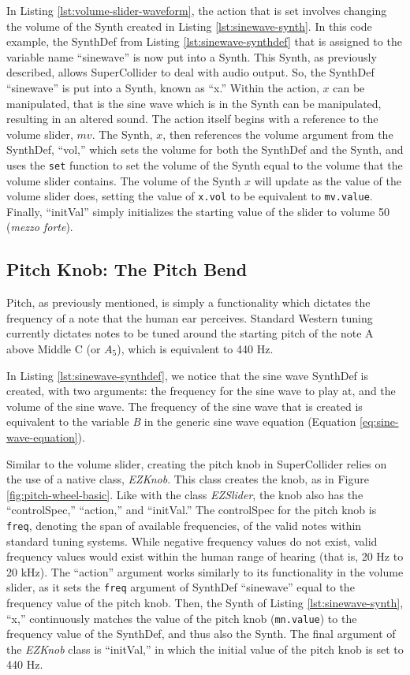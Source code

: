 In Listing \ref{lst:volume-slider-waveform}, the action that is set involves changing the volume of the Synth created in Listing \ref{lst:sinewave-synth}. In this code example, the SynthDef from Listing \ref{lst:sinewave-synthdef} that is assigned to the variable name ``sinewave'' is now put into a Synth. This Synth, as previously described, allows SuperCollider to deal with audio output. So, the SynthDef ``sinewave'' is put into a Synth, known as ``x.'' Within the action, $x$ can be manipulated, that is the sine wave which is in the Synth can be manipulated, resulting in an altered sound. The action itself begins with a reference to the volume slider, $mv$. The Synth, $x$, then references the volume argument from the SynthDef, ``vol,'' which sets the volume for both the SynthDef and the Synth, and uses the \texttt{set} function to set the volume of the Synth equal to the volume that the volume slider contains. The volume of the Synth $x$ will update as the value of the volume slider does, setting the value of \texttt{x.vol} to be equivalent to \texttt{mv.value}. Finally, ``initVal'' simply initializes the starting value of the slider to volume 50 (\textit{mezzo forte}).

\subsection{Pitch Knob: The Pitch Bend}

Pitch, as previously mentioned, is simply a functionality which dictates the frequency of a note that the human ear perceives. Standard Western tuning currently dictates notes to be tuned around the starting pitch of the note A above Middle C (or $A_5$), which is equivalent to 440 Hz.

In Listing \ref{lst:sinewave-synthdef}, we notice that the sine wave SynthDef is created, with two arguments: the frequency for the sine wave to play at, and the volume of the sine wave. The frequency of the sine wave that is created is equivalent to the variable \textit{B} in the generic sine wave equation (Equation \ref{eq:sine-wave-equation}).

Similar to the volume slider, creating the pitch knob in SuperCollider relies on the use of a native class, \textit{EZKnob}. This class creates the knob, as in Figure \ref{fig:pitch-wheel-basic}. Like with the class \textit{EZSlider}, the knob also has the ``controlSpec,'' ``action,'' and ``initVal.'' The controlSpec for the pitch knob is \texttt{freq}, denoting the span of available frequencies, of the valid notes within standard tuning systems. While negative frequency values do not exist, valid frequency values would exist within the human range of hearing (that is, 20 Hz to 20 kHz). The ``action'' argument works similarly to its functionality in the volume slider, as it sets the \texttt{freq} argument of SynthDef ``sinewave'' equal to the frequency value of the pitch knob. Then, the Synth of Listing \ref{lst:sinewave-synth}, ``x,'' continuously matches the value of the pitch knob (\texttt{mn.value}) to the frequency value of the SynthDef, and thus also the Synth. The final argument of the \textit{EZKnob} class is ``initVal,'' in which the initial value of the pitch knob is set to 440 Hz.

